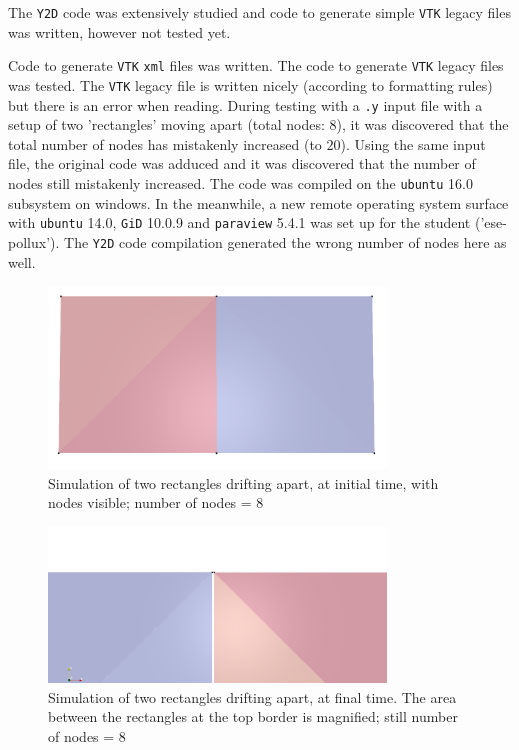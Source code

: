 \bigbreak
{}
The \texttt{Y2D} code was extensively studied and code to generate simple \texttt{VTK} legacy files was written, however not tested yet.

\bigbreak
{}
Code to generate \texttt{VTK} \texttt{xml} files was written. The code to generate \texttt{VTK} legacy files was tested. The \texttt{VTK} legacy file is written nicely (according to formatting rules) but there is an error when reading. During testing with a \texttt{.y} input file with a setup of two 'rectangles' moving apart (total nodes: $8$), it was discovered that the total number of nodes has mistakenly increased (to $20$). Using the same input file, the original code was adduced and it was discovered that the number of nodes still mistakenly increased. The code was compiled on the \texttt{ubuntu} 16.0 subsystem on windows. In the meanwhile, a new remote operating system surface with \texttt{ubuntu} 14.0, \texttt{GiD} 10.0.9 and \texttt{paraview} 5.4.1 was set up for the student ('ese-pollux'). The \texttt{Y2D} code compilation generated the wrong number of nodes here as well.

\begin{figure}[!h]
	\centering
	\includegraphics[width=0.8\textwidth]{rectangles.PNG}
	\caption{Simulation of two rectangles drifting apart, at initial time, with nodes visible; number of nodes = 8}
	\label{fig:geometry2}
\end{figure}

\begin{figure}[!h]
	\centering
	\includegraphics[width=0.8\textwidth]{endstate.PNG}
	\caption{Simulation of two rectangles drifting apart, at final time. The area between the rectangles at the top border is magnified; still number of nodes = 8}
	\label{fig:geometry2}
\end{figure}

